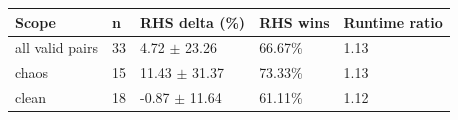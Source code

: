 \begin{tabular}{lllll}
\toprule
Scope & n & RHS delta (\%) & RHS wins & Runtime ratio \\
\midrule
all valid pairs & 33 & 4.72 $\pm$ 23.26 & 66.67\% & 1.13 \\
chaos & 15 & 11.43 $\pm$ 31.37 & 73.33\% & 1.13 \\
clean & 18 & -0.87 $\pm$ 11.64 & 61.11\% & 1.12 \\
\bottomrule
\end{tabular}
